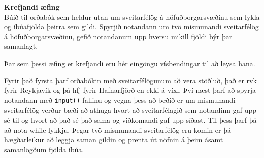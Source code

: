 \begin{exercise}\label{dic7}
\textbf{Krefjandi æfing}\\
Búið til orðabók sem heldur utan um sveitarfélög á höfuðborgarsvæðinu sem lykla og íbúafjölda þeirra sem gildi.
Spyrjið notandann um tvö mismunandi sveitarfélög á höfuðborgarsvæðinu, gefið notandanum upp hversu mikill fjöldi býr þar samanlagt.
\end{exercise}
\begin{Answer}[ref={dic7}]
Þar sem þessi æfing er krefjandi eru hér eingöngu vísbendingar til að leysa hana.

Fyrir það fyrsta þarf orðabókin með sveitarfélögunum að vera stöðluð, það er rvk fyrir Reykjavík og þá hfj fyrir Hafnarfjörð en ekki á víxl.
Því næst þarf að spyrja notandann með \texttt{input()} fallinu og vegna þess að beðið er um mismunandi sveitarfélög verður bæði að athuga hvort að sveitarfélagið sem notandinn gaf upp sé til og hvort að það sé það sama og viðkomandi gaf upp síðast.
Til þess þarf þá að nota while-lykkju.
Þegar tvö mismunandi sveitarfélög eru komin er þá hægðarleikur að leggja saman gildin og prenta út nöfnin á þeim ásamt samanlögðum fjölda íbúa.
\newpage
\end{Answer}


